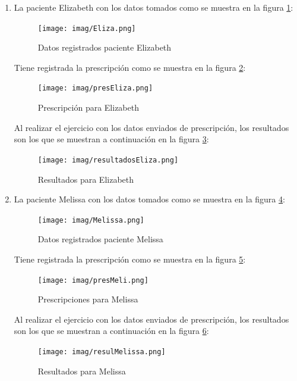 \documentclass[12pt]{article}
\begin{document}
\begin{enumerate}
    \item La paciente Elizabeth con los datos tomados como se muestra en la figura \ref{Eliza}:
    
    \begin{figure}[ht]
    \centering
    \texttt{[image: imag/Eliza.png]}
    \caption{Datos registrados paciente Elizabeth }
    \label{Eliza}
    \end{figure}
    \FloatBarrier
    
    Tiene registrada la prescripción como se muestra en la figura \ref{presEliza}:
    
    \begin{figure}[ht]
    \centering
    \texttt{[image: imag/presEliza.png]}
    \caption{Prescripción para Elizabeth }
    \label{presEliza}
    \end{figure}
    \FloatBarrier
    
    
    Al realizar el ejercicio con los datos enviados de prescripción, los resultados son los que se muestran a continuación en la figura \ref{resule}:

    \begin{figure}[ht]
    \centering
    \texttt{[image: imag/resultadosEliza.png]}
    \caption{Resultados para Elizabeth }
    \label{resule}
    \end{figure}
    \FloatBarrier
    
    
    
    
    \item La paciente Melissa con los datos tomados como se muestra en la figura \ref{meli}:
    
    \begin{figure}[ht]
    \centering
    \texttt{[image: imag/Melissa.png]}
    \caption{Datos registrados paciente Melissa }
    \label{meli}
    \end{figure}
    \FloatBarrier
    
    Tiene registrada la prescripción como se muestra en la figura \ref{presmeli}:
    
    \begin{figure}[ht]
    \centering
    \texttt{[image: imag/presMeli.png]}
    \caption{Prescripciones para Melissa}
    \label{presmeli}
    \end{figure}
    \FloatBarrier
    
    
    Al realizar el ejercicio con los datos enviados de prescripción, los resultados son los que se muestran a continuación en la figura \ref{resulm}:

    \begin{figure}[ht]
    \centering
    \texttt{[image: imag/resulMelissa.png]}
    \caption{Resultados para Melissa}
    \label{resulm}
    \end{figure}
    \FloatBarrier
    
    
    
    
    
    
\end{enumerate}
\end{document}
